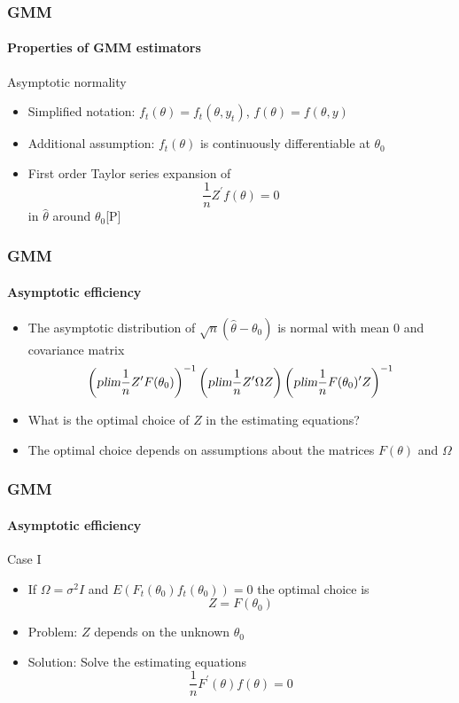 \documentclass{beamer}
\begin{document}
\begin{frame}\frametitle{GMM}\framesubtitle{Properties of GMM estimators}
Asymptotic normality
\begin{itemize}
    \item Simplified notation: $f_{t}(\theta )=f_{t}(\theta ,y_{t})$, $f\left(\theta \right) =f\left( \theta ,y\right) $
    \item Additional assumption: $f_{t}\left( \theta \right) $ is continuously differentiable at $\theta _{0}$
    \item First order Taylor series expansion of
    \begin{equation*}
    \frac{1}{n}Z^{\prime }f\left( \theta \right) =0
    \end{equation*}
    in $\hat{\theta}$ around $\theta _{0}$\hfill [P]
\end{itemize}
\end{frame}


\begin{frame}\frametitle{GMM}\framesubtitle{Asymptotic efficiency}
\begin{itemize}
    \item The asymptotic distribution of $\sqrt{n}\left( \hat{\theta}-\theta_{0}\right) $ is normal with \newline
    mean 0 and covariance matrix
    \begin{equation*}
    \left( \textsl{plim}\frac{1}{n}Z^{\prime }F(\theta _{0})\right) ^{-1}\left(\textsl{plim}\frac{1}{n}Z^{\prime }\Omega Z\right) \left( \textsl{plim} \frac{1}{n}F(\theta _{0})^{\prime }Z\right)^{-1}
    \end{equation*}
    \item What is the optimal choice of $Z$ in the estimating equations?
    \item The optimal choice depends on assumptions about the matrices $F(\theta)$ and $\Omega $
\end{itemize}
\end{frame}


\begin{frame}\frametitle{GMM}\framesubtitle{Asymptotic efficiency}
Case I
\begin{itemize}
    \item If $\Omega =\sigma ^{2}I$ and $E(F_{t}(\theta _{0})f_{t}(\theta_{0}))=0$ the optimal choice is
    \begin{equation*}
    Z=F(\theta _{0})
    \end{equation*}
    \item Problem: $Z$ depends on the unknown $\theta _{0}$
    \item Solution: Solve the estimating equations
    \begin{equation*}
    \frac{1}{n}F^{\prime }(\theta )f(\theta )=0
    \end{equation*}
\end{itemize}
\end{frame}
\end{document}
